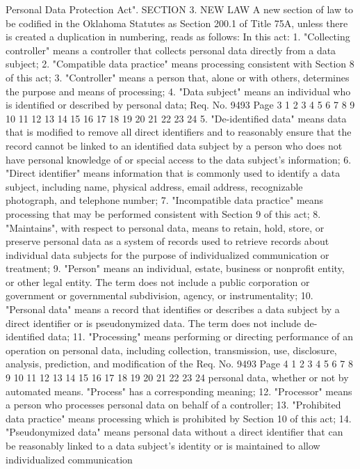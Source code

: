 Personal Data Protection Act".
SECTION 3. NEW LAW A new section of law to be codified
in the Oklahoma Statutes as Section 200.1 of Title 75A, unless there
is created a duplication in numbering, reads as follows:
In this act:
1. "Collecting controller" means a controller that collects
personal data directly from a data subject;
2. "Compatible data practice" means processing consistent with
Section 8 of this act;
3. "Controller" means a person that, alone or with others,
determines the purpose and means of processing;
4. "Data subject" means an individual who is identified or
described by personal data;
Req. No. 9493 Page 3
1
2
3
4
5
6
7
8
9
10
11
12
13
14
15
16
17
18
19
20
21
22
23
24
5. "De-identified data" means data that is modified to remove
all direct identifiers and to reasonably ensure that the record
cannot be linked to an identified data subject by a person who does
not have personal knowledge of or special access to the data
subject's information;
6. "Direct identifier" means information that is commonly used
to identify a data subject, including name, physical address, email
address, recognizable photograph, and telephone number;
7. "Incompatible data practice" means processing that may be
performed consistent with Section 9 of this act;
8. "Maintains", with respect to personal data, means to retain,
hold, store, or preserve personal data as a system of records used
to retrieve records about individual data subjects for the purpose
of individualized communication or treatment;
9. "Person" means an individual, estate, business or nonprofit
entity, or other legal entity. The term does not include a public
corporation or government or governmental subdivision, agency, or
instrumentality;
10. "Personal data" means a record that identifies or describes
a data subject by a direct identifier or is pseudonymized data. The
term does not include de-identified data;
11. "Processing" means performing or directing performance of
an operation on personal data, including collection, transmission,
use, disclosure, analysis, prediction, and modification of the 
Req. No. 9493 Page 4
1
2
3
4
5
6
7
8
9
10
11
12
13
14
15
16
17
18
19
20
21
22
23
24
personal data, whether or not by automated means. "Process" has a
corresponding meaning;
12. "Processor" means a person who processes personal data on
behalf of a controller;
13. "Prohibited data practice" means processing which is
prohibited by Section 10 of this act;
14. "Pseudonymized data" means personal data without a direct
identifier that can be reasonably linked to a data subject's
identity or is maintained to allow individualized communication

